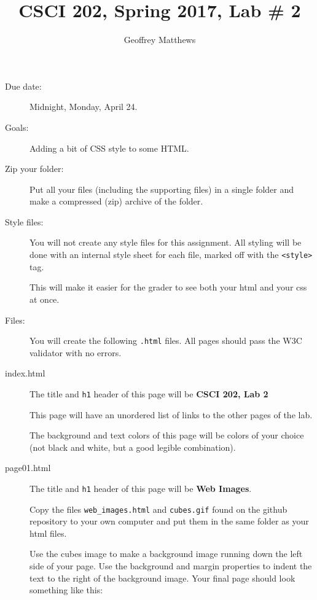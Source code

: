 \documentclass{article}
\title{CSCI 202, Spring 2017, Lab \# 2}
\author{Geoffrey Matthews}
\begin{document}
\maketitle

\begin{description}

\item[Due date:] Midnight, Monday, April 24.

\item[Goals:] Adding a bit of CSS style to some HTML.

\item[Zip your folder:]

  Put all your files (including the supporting files) in a single
  folder and  make a compressed (zip) archive of the folder.

\item[Style files:]  You will not create any style files for this
  assignment.  All styling will be done with an internal style sheet
  for each file, marked off with the \verb|<style>| tag.

  This will make it easier for the grader to see both your html and
  your css at once.

\item[Files:]  You will create the following {\tt .html} files.
    All pages should pass the W3C validator with no errors.

    \item[index.html]     The title and {\tt h1} header of this page
      will be {\bf CSCI 202, Lab 2}

      This page will have an unordered list of links to the other
      pages of the lab.

      The background and text colors
      of this page will be colors of your choice (not black and white,
      but a good legible combination).

  \item[page01.html]


    The title and {\tt h1} header of this page will be {\bf Web
      Images}.

    Copy the files \verb|web_images.html| and \verb|cubes.gif| found
    on the github repository to your own computer and put them in the
    same folder as your html files.
    
  Use the cubes image to make a background image running down the left
  side of your page.  Use the background and margin properties to
  indent the text to the right of the background image.  Your final
  page should look something like this:


\end{description}
\end{document}
